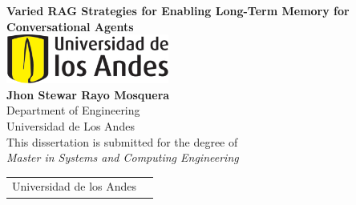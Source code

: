 \centering
\vspace*{0.5in}

{\huge \textbf{Varied RAG Strategies for Enabling Long-Term Memory for Conversational Agents}}\\[2.0cm]

\includegraphics[width=0.4\textwidth]{images/uniandes.pdf}\\[2.0cm]

{\Large \textbf{Jhon Stewar Rayo Mosquera}}\\[1.0cm]
{Department of Engineering}\\[0.1cm]
{Universidad de Los Andes}\\[2.0cm]

{This dissertation is submitted for the degree of}\\
{\emph{Master in Systems and Computing Engineering}}

\vfill

\begin{tabular}{@{}p{}@{}p{}@{}}
    \raggedright {Universidad de los Andes} & \raggedleft {January 2025}
\end{tabular}
